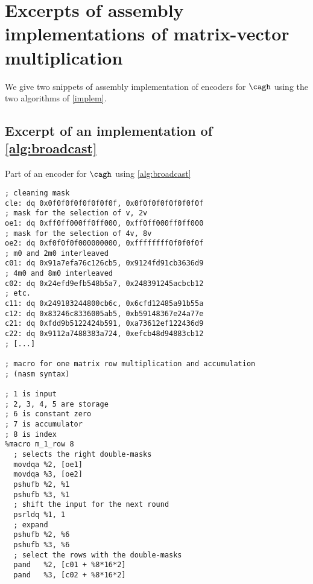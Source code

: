 \FloatBarrier

\section{Excerpts of assembly implementations of matrix-vector multiplication}

We give two snippets of assembly implementation of encoders for $\cagh$
using the two algorithms of \autoref{implem}.

\subsection{Excerpt of an implementation of \autoref{alg:broadcast}}
\label{app:gene}
{\small
\begin{listing}[!htb]
\begin{center}
\caption{Part of an encoder for $\cagh$ using \autoref{alg:broadcast}}
\begin{verbatim}
; cleaning mask
cle: dq 0x0f0f0f0f0f0f0f0f, 0x0f0f0f0f0f0f0f0f
; mask for the selection of v, 2v
oe1: dq 0xff0ff000ff0ff000, 0xff0ff000ff0ff000
; mask for the selection of 4v, 8v
oe2: dq 0xf0f0f0f000000000, 0xffffffff0f0f0f0f
; m0 and 2m0 interleaved
c01: dq 0x91a7efa76c126cb5, 0x9124fd91cb3636d9
; 4m0 and 8m0 interleaved
c02: dq 0x24efd9efb548b5a7, 0x248391245acbcb12
; etc.
c11: dq 0x249183244800cb6c, 0x6cfd12485a91b55a
c12: dq 0x83246c8336005ab5, 0xb59148367e24a77e
c21: dq 0xfdd9b5122424b591, 0xa73612ef122436d9
c22: dq 0x9112a7488383a724, 0xefcb48d94883cb12
; [...]

; macro for one matrix row multiplication and accumulation
; (nasm syntax)

; 1 is input
; 2, 3, 4, 5 are storage
; 6 is constant zero
; 7 is accumulator
; 8 is index
%macro m_1_row 8
  ; selects the right double-masks
  movdqa %2, [oe1]
  movdqa %3, [oe2]
  pshufb %2, %1 
  pshufb %3, %1
  ; shift the input for the next round
  psrldq %1, 1
  ; expand
  pshufb %2, %6
  pshufb %3, %6
  ; select the rows with the double-masks
  pand   %2, [c01 + %8*16*2]
  pand   %3, [c02 + %8*16*2]
\end{verbatim}
\end{center}
\end{listing}
}



